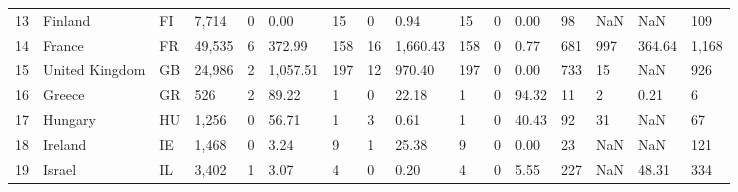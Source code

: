 \begin{tabular}{llllllllllllllll}
13 &             Finland &        FI  &                7,714 &               0 &                     0.00 &                        15 &               0 &                     0.94 &                        15 &               0 &                     0.00 &                        98 &                 NaN &                      NaN &                       109 \\
14 &              France &        FR  &               49,535 &               6 &                   372.99 &                       158 &              16 &                 1,660.43 &                       158 &               0 &                     0.77 &                       681 &                 997 &                   364.64 &                     1,168 \\
15 &      United Kingdom &        GB  &               24,986 &               2 &                 1,057.51 &                       197 &              12 &                   970.40 &                       197 &               0 &                     0.00 &                       733 &                  15 &                      NaN &                       926 \\
16 &              Greece &        GR  &                  526 &               2 &                    89.22 &                         1 &               0 &                    22.18 &                         1 &               0 &                    94.32 &                        11 &                   2 &                     0.21 &                         6 \\
17 &             Hungary &        HU  &                1,256 &               0 &                    56.71 &                         1 &               3 &                     0.61 &                         1 &               0 &                    40.43 &                        92 &                  31 &                      NaN &                        67 \\
18 &             Ireland &        IE  &                1,468 &               0 &                     3.24 &                         9 &               1 &                    25.38 &                         9 &               0 &                     0.00 &                        23 &                 NaN &                      NaN &                       121 \\
19 &              Israel &        IL  &                3,402 &               1 &                     3.07 &                         4 &               0 &                     0.20 &                         4 &               0 &                     5.55 &                       227 &                 NaN &                    48.31 &                       334 \\

\end{tabular}
